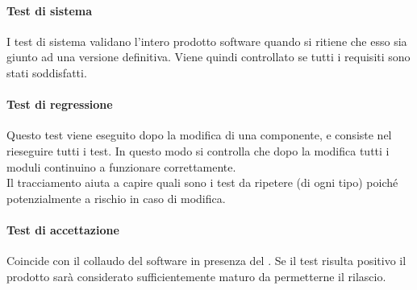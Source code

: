 			\paragraph{Test di sistema}
				I test di sistema validano l'intero prodotto software quando si ritiene che esso sia giunto ad una versione definitiva. Viene quindi controllato se tutti i requisiti sono stati soddisfatti.
			\paragraph{Test di regressione}
				Questo test viene eseguito dopo la modifica di una componente, e consiste nel rieseguire tutti i test. In questo modo si controlla che dopo la modifica tutti i moduli continuino a funzionare correttamente. \\
				Il tracciamento aiuta a capire quali sono i test da ripetere (di ogni tipo) poiché potenzialmente a rischio in caso di modifica.
			\paragraph{Test di accettazione}
				Coincide con il collaudo del software in presenza del . Se il test risulta positivo il prodotto sarà considerato sufficientemente maturo da permetterne il rilascio.
		
		\label{sec:MisureGenerale} %
		\label{sec:Misure} %